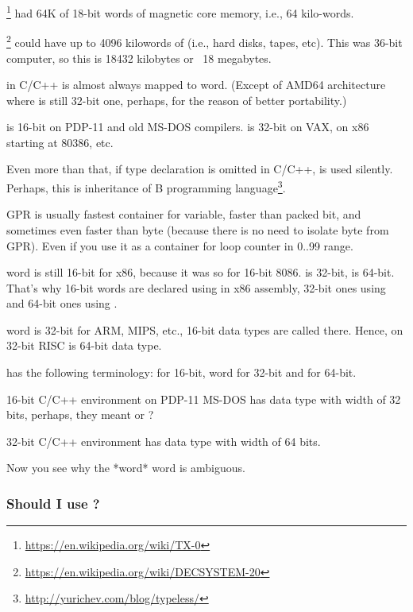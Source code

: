 \footnote{\url{https://en.wikipedia.org/wiki/TX-0}} had 64K of 18-bit words of magnetic core memory,
i.e., 64 kilo-words.

\footnote{\url{https://en.wikipedia.org/wiki/DECSYSTEM-20}}
could have up to 4096 kilowords of 
(i.e., hard disks, tapes, etc).
This was 36-bit computer, so this is 18432 kilobytes or ~18 megabytes.

\myhrule{}

 in C/C++ is almost always mapped to \gls{word}.
(Except of AMD64 architecture where  is still 32-bit one, perhaps, for the reason of better portability.)

 is 16-bit on PDP-11 and old MS-DOS compilers.
 is 32-bit on VAX, on x86 starting at 80386, etc.

Even more than that, if type declaration is omitted in C/C++,  is used silently.
Perhaps, this is inheritance of B programming language\footnote{\url{http://yurichev.com/blog/typeless/}}.

\myhrule{}

\ac{GPR} is usually fastest container for variable, faster than packed bit,
and sometimes even faster than byte (because there is no need to isolate byte from \ac{GPR}).
Even if you use it as a container for loop counter in 0..99 range.

\myhrule{}

\Gls{word} is still 16-bit for x86, because it was so for 16-bit 8086.
 is 32-bit,  is 64-bit.
That's why 16-bit words are declared using  in x86 assembly, 32-bit ones using  and 64-bit ones using .

\Gls{word} is 32-bit for ARM, MIPS, etc., 16-bit data types are called  there.
Hence,  on 32-bit RISC is 64-bit data type.

 has the following terminology:  for 16-bit, \gls{word} for 32-bit and  for 64-bit.

16-bit C/C++ environment on PDP-11 MS-DOS has  data type with width of 32 bits, perhaps,
they meant  or ?

32-bit C/C++ environment has  data type with width of 64 bits.

Now you see why the *word* word is ambiguous.

\subsubsection{Should I use ?}

